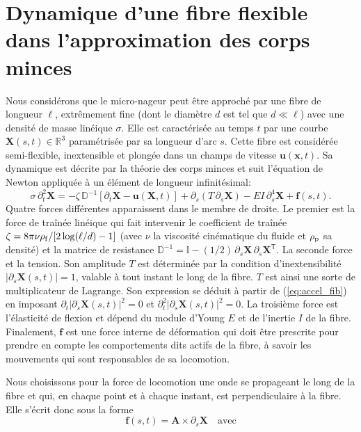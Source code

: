 \documentclass[a4paper,11pt]{article}
\begin{document}
\section{Dynamique d'une fibre flexible dans l'approximation des corps minces}
Nous considérons que le micro-nageur peut être approché par une fibre de longueur $\ell$, extrêmement fine (dont le diamètre $d$ est tel que $d\ll\ell$)  avec une densité de masse linéique $\sigma$. Elle est caractérisée au temps $t$ par une courbe $\bm X(s,t)\in\mathbb{R}^3$ paramétrisée par sa longueur d'arc $s$.  Cette fibre est considérée semi-flexible, inextensible et plongée dans un champs de vitesse $\bm u(\bm x,t)$.  Sa dynamique est décrite par la théorie des corps minces  et suit l'équation de Newton appliquée à un élément de longueur infinitésimal:
\begin{equation}
	\sigma\,\partial_t ^2 \bm X = -\zeta\,\mathbb{D}^{-1} \left[\partial_t \bm X - \bm u(\bm X,t) \right] + \partial_s(T\,\partial_s \bm X) - EI\,\partial_s^4 \bm X + \bm f(s,t).
	\label{eq:accel_fib}
\end{equation}
Quatre forces différentes apparaissent dans le membre de droite. Le premier est la force de traînée linéique qui fait intervenir le coefficient de traînée $\zeta = 8\pi\nu\rho_{\rm f}/[2\log(\ell/d)-1]$ (avec $\nu$ la viscosité cinématique du fluide et $\rho_{\rm p}$ sa densité) et la matrice de resistance $\mathbb{D}^{-1}  = \mathbb{I} -(1/2)\, \partial_s\bm X\,\partial_s\bm X^{\mathsf{T}}$. La seconde force et la tension. Son amplitude $T$ est déterminée  par la condition d'inextensibilité $|\partial_s\bm X(s,t)| = 1$, valable à tout instant le long de la fibre. $T$ est ainsi une sorte de multiplicateur de Lagrange. Son expression se déduit à partir de (\ref{eq:accel_fib}) en imposant  $\partial_t |\partial_s\bm X(s,t)|^2 = 0$ et $\partial_t^2|\partial_s\bm X(s,t)|^2 = 0$. La troisième force est l'élasticité de flexion et dépend du module d'Young $E$ et de l'inertie $I$ de la fibre. Finalement, $\bm f$ est une force interne de déformation qui doit être prescrite pour prendre en compte les comportements dits actifs de la fibre, à savoir les mouvements qui sont responsables de sa locomotion.

Nous choisissons pour la force de locomotion une onde se propageant le long de la fibre et qui, en chaque point et à chaque instant, est perpendiculaire à la fibre. Elle s'écrit donc sous la forme
\begin{equation}
	\bm f(s,t) = \bm A \times \partial_s \bm X\quad\mbox{avec} 
	\label{eq:f_locomotion}
\end{equation}
\end{document}
